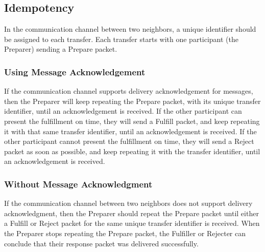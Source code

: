 \documentclass[11pt,twoside,a4paper]{article}
\begin{document}
\subsection{Idempotency}
In the communication channel between two neighbors,
a unique identifier should be assigned to each transfer. Each transfer starts with one participant (the Preparer) sending a Prepare packet.

\subsubsection{Using Message Acknowledgement}
If the communication channel supports delivery acknowledgement for messages, then the Preparer will keep repeating the Prepare packet, with its unique transfer identifier,
until an acknowledgement is received.
If the other participant can present the fulfillment on time, they will send a Fulfill packet, and keep repeating it with that same transfer identifier, until an acknowledgement is received.
If the other participant cannot present the fulfillment on time, they will send a Reject packet as soon as possible, and keep repeating it with the transfer identifier,
until an acknowledgement is received.

\subsubsection{Without Message Acknowledgment}
If the communication channel between two neighbors does not support delivery acknowledgment, then the Preparer should repeat the Prepare packet until either a Fulfill or Reject
packet for the same unique transfer identifier is received. When the Preparer stops repeating the Prepare packet, the Fulfiller or Rejecter can conclude that their response packet
was delivered successfully.
\end{document}
